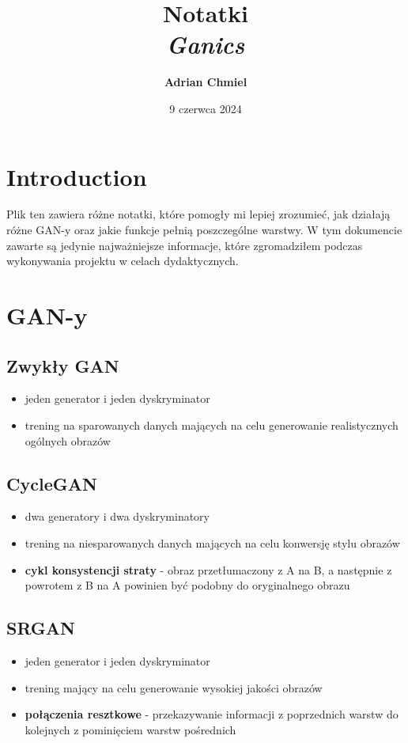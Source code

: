 \documentclass{article}
\begin{document}
\title{\textbf{Notatki}
\\ \large{\textit{Ganics}}}
\author{\textbf{Adrian Chmiel}}
\date{9 czerwca 2024}
\maketitle

\section{Introduction}
Plik ten zawiera różne notatki, które pomogły mi lepiej zrozumieć, jak działają różne GAN-y oraz jakie funkcje pełnią poszczególne warstwy. W tym dokumencie zawarte są jedynie najważniejsze informacje, które zgromadziłem podczas wykonywania projektu w celach dydaktycznych.

\section{GAN-y}
\subsection{Zwykły GAN}
\begin{itemize}
    \item jeden generator i jeden dyskryminator
    \item trening na sparowanych danych mających na celu generowanie realistycznych ogólnych obrazów
\end{itemize}

\subsection{CycleGAN}
\begin{itemize}
    \item dwa generatory i dwa dyskryminatory
    \item trening na niesparowanych danych mających na celu konwersję stylu obrazów
    \item \textbf{cykl konsystencji straty} - obraz przetłumaczony z A na B, a następnie z powrotem z B na A powinien być podobny do oryginalnego obrazu
\end{itemize}

\subsection{SRGAN}
\begin{itemize}
    \item jeden generator i jeden dyskryminator
    \item trening mający na celu generowanie wysokiej jakości obrazów
    \item \textbf{połączenia resztkowe} - przekazywanie informacji z poprzednich warstw do kolejnych z pominięciem warstw pośrednich
\end{itemize}
\end{document}
